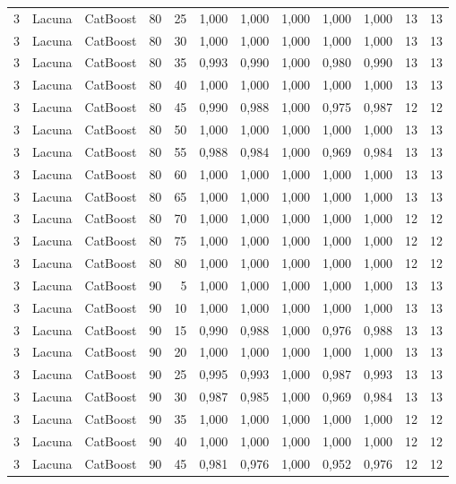 \begin{longtable}{@{}rllrrrrrrrrr@{}}
3 & Lacuna & CatBoost & 80 & 25 & 1,000 & 1,000 & 1,000 & 1,000 & 1,000 & 13 & 13 \\
3 & Lacuna & CatBoost & 80 & 30 & 1,000 & 1,000 & 1,000 & 1,000 & 1,000 & 13 & 13 \\
3 & Lacuna & CatBoost & 80 & 35 & 0,993 & 0,990 & 1,000 & 0,980 & 0,990 & 13 & 13 \\
3 & Lacuna & CatBoost & 80 & 40 & 1,000 & 1,000 & 1,000 & 1,000 & 1,000 & 13 & 13 \\
3 & Lacuna & CatBoost & 80 & 45 & 0,990 & 0,988 & 1,000 & 0,975 & 0,987 & 12 & 12 \\
3 & Lacuna & CatBoost & 80 & 50 & 1,000 & 1,000 & 1,000 & 1,000 & 1,000 & 13 & 13 \\
3 & Lacuna & CatBoost & 80 & 55 & 0,988 & 0,984 & 1,000 & 0,969 & 0,984 & 13 & 13 \\
3 & Lacuna & CatBoost & 80 & 60 & 1,000 & 1,000 & 1,000 & 1,000 & 1,000 & 13 & 13 \\
3 & Lacuna & CatBoost & 80 & 65 & 1,000 & 1,000 & 1,000 & 1,000 & 1,000 & 13 & 13 \\
3 & Lacuna & CatBoost & 80 & 70 & 1,000 & 1,000 & 1,000 & 1,000 & 1,000 & 12 & 12 \\
3 & Lacuna & CatBoost & 80 & 75 & 1,000 & 1,000 & 1,000 & 1,000 & 1,000 & 12 & 12 \\
3 & Lacuna & CatBoost & 80 & 80 & 1,000 & 1,000 & 1,000 & 1,000 & 1,000 & 12 & 12 \\
3 & Lacuna & CatBoost & 90 & 5 & 1,000 & 1,000 & 1,000 & 1,000 & 1,000 & 13 & 13 \\
3 & Lacuna & CatBoost & 90 & 10 & 1,000 & 1,000 & 1,000 & 1,000 & 1,000 & 13 & 13 \\
3 & Lacuna & CatBoost & 90 & 15 & 0,990 & 0,988 & 1,000 & 0,976 & 0,988 & 13 & 13 \\
3 & Lacuna & CatBoost & 90 & 20 & 1,000 & 1,000 & 1,000 & 1,000 & 1,000 & 13 & 13 \\
3 & Lacuna & CatBoost & 90 & 25 & 0,995 & 0,993 & 1,000 & 0,987 & 0,993 & 13 & 13 \\
3 & Lacuna & CatBoost & 90 & 30 & 0,987 & 0,985 & 1,000 & 0,969 & 0,984 & 13 & 13 \\
3 & Lacuna & CatBoost & 90 & 35 & 1,000 & 1,000 & 1,000 & 1,000 & 1,000 & 12 & 12 \\
3 & Lacuna & CatBoost & 90 & 40 & 1,000 & 1,000 & 1,000 & 1,000 & 1,000 & 12 & 12 \\
3 & Lacuna & CatBoost & 90 & 45 & 0,981 & 0,976 & 1,000 & 0,952 & 0,976 & 12 & 12 \\

\end{longtable}
